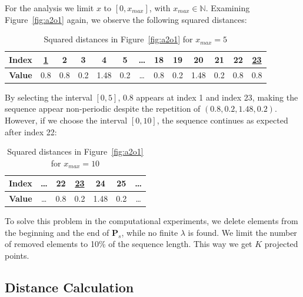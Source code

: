 \documentclass[11pt]{article}
\theoremstyle{remark}
\begin{document}
%
For the analysis we limit $x$ to $[0, x_{max}]$, with $x_{max} \in \mathbb{N}$.
%
Examining Figure~\ref{fig:a2o1} again, we observe the following squared distances:
%
\begin{table}[htbp]
\centering
\begin{tabular}{| c | c || c | c | c | c | c | c | c | c | c | c || c |}
    \hline
    \textbf{Index} & \underline{1} &   2 &   3 &    4 &   5 & \dots &  18 &  19 &  20  &  21 &  22 &  \underline{23} \\ \hline
    \textbf{Value} &           0.8 & 0.8 & 0.2 & 1.48 & 0.2 & \dots & 0.8 & 0.2 & 1.48 & 0.2 & 0.8 &             0.8 \\ \hline
\end{tabular}
\caption{Squared distances in Figure~\ref{fig:a2o1} for $x_{max} = 5$}
\label{tab:distances1}
\end{table}

By selecting the interval $[0, 5]$, $0.8$ appears at index 1 and index 23, making the sequence appear non-periodic despite the repetition of $(0.8, 0.2, 1.48, 0.2)$. However, if we choose the interval $[0, 10]$, the sequence continues as expected after index 22:
%
\begin{table}[htbp]
\centering
  \begin{tabular}{| c | c | c | c | c | c | c |}
    \hline
    \textbf{Index} & \dots &  22 & \underline{23} &   24 &  25 & \dots \\ \hline
    \textbf{Value} & \dots & 0.8 &            0.2 & 1.48 & 0.2 & \dots \\ \hline
  \end{tabular}
\caption{Squared distances in Figure~\ref{fig:a2o1} for $x_{max} = 10$}
\label{tab:distances2}
\end{table}

To solve this problem in the computational experiments, we delete elements from the beginning and the end of $\mathbf{P}_s$, while no finite $\lambda$ is found. We limit the number of removed elements to 10\% of the sequence length.
%
This way we get $K$ projected points.

\subsection{Distance Calculation}
\end{document}
